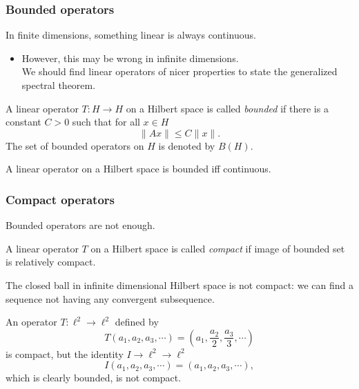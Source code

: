 \documentclass[10pt]{beamer}
\begin{document}
\begin{frame}
\frametitle{Bounded operators}
  \begin{thm}[?]
    In finite dimensions, something linear is always continuous.
  \end{thm}
  \pause \begin{itemize} \item However, this may be wrong in infinite dimensions.\\ We should find linear operators of nicer properties to state the generalized spectral theorem.\end{itemize} \pause
  \begin{defn}
    A linear operator $T:H\to H$ on a Hilbert space is called \emph{bounded} if there is a constant $C>0$ such that for all $x\in H$
    \[\|Ax\|\le C\|x\|.\]
    The set of bounded operators on $H$ is denoted by $B(H)$.
  \end{defn}
  \pause
  \begin{thm}
    A linear operator on a Hilbert space is bounded iff continuous.
  \end{thm}
\end{frame}

\begin{frame}
\frametitle{Compact operators}
  Bounded operators are not enough.
  \begin{defn}
    A linear operator $T$ on a Hilbert space is called \emph{compact} if image of bounded set is relatively compact.
  \end{defn}
  \pause
  \begin{rmk}
    The closed ball in infinite dimensional Hilbert space is not compact: we can find a sequence not having any convergent subsequence.
  \end{rmk}
  \pause
  \begin{ex}
    An operator $T:\ell^2\to\ell^2$ defined by
    \[T(a_1,a_2,a_3,\cdots)=(a_1,\frac{a_2}2,\frac{a_3}3,\cdots)\]
    is compact, but the identity $I\to\ell^2\to\ell^2$
    \[I(a_1,a_2,a_3,\cdots)=(a_1,a_2,a_3,\cdots),\]
    which is clearly bounded, is not compact.
  \end{ex}
\end{frame}
\end{document}
